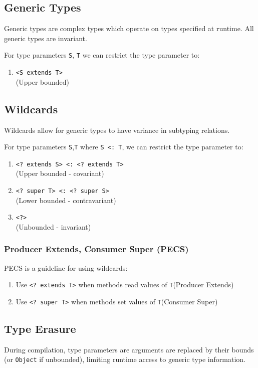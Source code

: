 \documentclass[12pt, a4paper]{article}
\begin{document}
\begin{multicols*}{3}
\section{Generic Types}
Generic types are complex types which operate on types specified at runtime. All generic types are invariant.

For type parameters \lstinline|S|, \lstinline|T| we can restrict the type parameter to:
\begin{enumerate}[\roman*.]
  \item \lstinline|<S extends T>|\\(Upper bounded)
\end{enumerate}

\subsection{Wildcards}
Wildcards allow for generic types to have variance in subtyping relations.

For type parameters \lstinline|S|,\lstinline|T| where \lstinline|S <: T|, we can restrict the type parameter to:
\begin{enumerate}[\roman*.]
  \item \lstinline|<? extends S> <: <? extends T>|\\(Upper bounded - covariant)
  \item \lstinline|<? super T> <: <? super S>|\\(Lower bounded - contravariant)
  \item \lstinline|<?>|\\(Unbounded - invariant)
\end{enumerate}

\subsubsection{Producer Extends, Consumer Super (PECS)}
PECS is a guideline for using wildcards:
\begin{enumerate}[\roman*.]
  \item Use \lstinline|<? extends T>| when methods read values of \lstinline|T|\hfill(Producer Extends)
  \item Use \lstinline|<? super T>| when methods set values of \lstinline|T|\hfill(Consumer Super)
\end{enumerate}

\subsection{Type Erasure}
During compilation, type parameters are arguments are replaced by their bounds (or \lstinline|Object| if unbounded), limiting runtime access to generic type information.


\end{multicols*}
\end{document}
